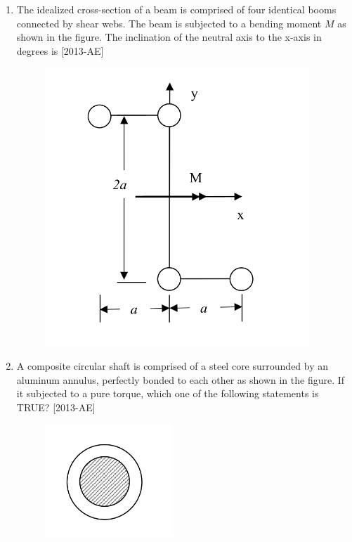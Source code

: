 \documentclass[journal]{IEEEtran}
\begin{document}
\begin{enumerate}[start=27]
\begin{enumerate}
\end{enumerate}
\item The idealized cross-section of a beam is comprised of four identical booms connected by shear webs. The beam is subjected to a bending moment $M$ as shown in the figure. The inclination of the neutral axis to the x-axis in degrees is \hfill{[2013-AE]}
\begin{figure}[H]
    \centering
    \includegraphics[width=0.5\linewidth]{figs/Figure_3.png}
    \label{fig:enter-label}
\end{figure}
\begin{enumerate}
\end{enumerate}
\item A composite circular shaft is comprised of a steel core surrounded by an aluminum annulus, perfectly bonded to each other as shown in the figure. If it subjected to a pure torque, which one of the following statements is TRUE? \hfill{[2013-AE]}
\begin{figure}[H]
    \centering
    \includegraphics[width=0.5\linewidth]{figs/Figure_1.png}

\end{figure}
\end{enumerate}
\end{document}
